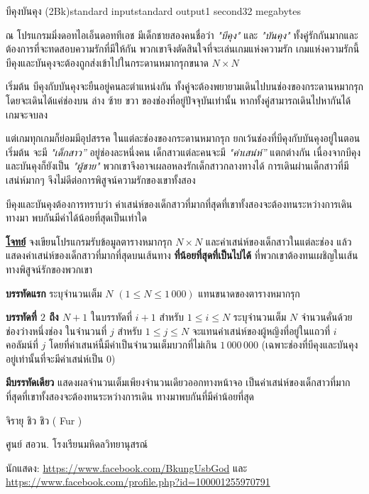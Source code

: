 \documentclass[11pt,a4paper]{article}
\begin{document}
\begin{problem}{บีคุงบันคุง (2Bk)}{standard input}{standard output}{1 second}{32 megabytes}

 ณ โปรแกรมมิ่งดอทไอเอ็นดอททีเอช มีเด็กชายสองคนชื่อว่า \textit{"บีคุง"} และ \textit{"บันคุง"} ทั้งคู่รักกันมากและต้องการที่จะทดสอบความรักที่มีให้กัน พวกเขาจึงตัดสินใจที่จะเล่นเกมแห่งความรัก เกมแห่งความรักนี้บีคุงและบันคุงจะต้องถูกส่งเข้าไปในกระดานหมากรุกขนาด $N \times N$

                เริ่มต้น บีคุงกับบันคุงจะยืนอยู่คนละตำแหน่งกัน ทั้งคู่จะต้องพยายามเดินไปบนช่องของกระดานหมากรุก โดยจะเดินได้แค่ช่องบน ล่าง ซ้าย ขวา ของช่องที่อยู่ปัจจุบันเท่านั้น หากทั้งคู่สามารถเดินไปหากันได้ เกมจะจบลง

                แต่เกมทุกเกมก็ย่อมมีอุปสรรค ในแต่ละช่องของกระดานหมากรุก ยกเว้นช่องที่บีคุงกับบันคุงอยู่ในตอนเริ่มต้น จะมี \textit{"เด็กสาว”} อยู่ช่องละหนึ่งคน เด็กสาวแต่ละคนจะมี \textit{"ค่าเสน่ห์”} แตกต่างกัน เนื่องจากบีคุงและบันคุงก็ยังเป็น \textit{"ผู้ชาย"} พวกเขาจึงอาจเผลอหลงรักเด็กสาวกลางทางได้ การเดินผ่านเด็กสาวที่มีเสน่ห์มากๆ จึงไม่ดีต่อการพิสูจน์ความรักของเขาทั้งสอง

                บีคุงและบันคุงต้องการทราบว่า ค่าเสน่ห์ของเด็กสาวที่มากที่สุดที่เขาทั้งสองจะต้องทนระหว่างการเดินทางมา พบกันมีค่าได้น้อยที่สุดเป็นเท่าใด

\bigskip
\underline{\textbf{โจทย์}}  จงเขียนโปรแกรมรับข้อมูลตารางหมากรุก $N \times N$ และค่าเสน่ห์ของเด็กสาวในแต่ละช่อง แล้วแสดงค่าเสน่ห์ของเด็กสาวที่มากที่สุดบนเส้นทาง \textbf{ที่น้อยที่สุดที่เป็นไปได้} ที่พวกเขาต้องทนเผชิญในเส้นทางพิสูจน์รักของพวกเขา


\InputFile

\textbf{บรรทัดแรก} ระบุจำนวนเต็ม $N$ $(1 \leq  N \leq 1\,000)$ แทนขนาดของตารางหมากรุก

\textbf{บรรทัดที่ $2$ ถึง $N+1$} ในบรรทัดที่ $i + 1$ สำหรับ $1 \leq i \leq N$ ระบุจำนวนเต็ม $N$ จำนวนคั่นด้วยช่องว่างหนึ่งช่อง ในจำนวนที่ $j$ สำหรับ $1 \leq j \leq N$ จะแทนค่าเสน่ห์ของผู้หญิงที่อยู่ในแถวที่ $i$ คอลัมน์ที่ $j$ โดยที่ค่าเสนห์นี้มีค่าเป็นจำนวนเต็มบวกที่ไม่เกิน $1\,000\,000$ (เฉพาะช่องที่บีคุงและบันคุงอยู่เท่านั้นที่จะมีค่าเสน่ห์เป็น $0$)


\OutputFile

\textbf{มีบรรทัดเดียว} แสดงผลจำนวนเต็มเพียงจำนวนเดียวออกทางหน้าจอ เป็นค่าเสน่ห์ของเด็กสาวที่มากที่สุดที่เขาทั้งสองจะต้องทนระหว่างการเดิน ทางมาพบกันที่มีค่าน้อยที่สุด

\Examples

\begin{example}
%
%
\end{example}


\Source

จิรายุ ชิว ชิว ( Fur )

ศูนย์ สอวน. โรงเรียนมหิดลวิทยานุสรณ์

นักแสดง: \url{https://www.facebook.com/BkungUsbGod} และ\\ \url{https://www.facebook.com/profile.php?id=100001255970791}


\end{problem}
\end{document}
